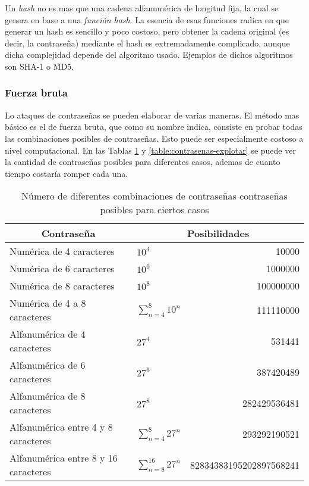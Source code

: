 Un \emph{hash} no es mas que una cadena alfanumérica de longitud fija, la cual se genera en base a una \emph{función hash}. La esencia de esas funciones radica en que generar un hash es sencillo y poco costoso, pero obtener la cadena original (es decir, la contraseña) mediante el hash es extremadamente complicado, aunque dicha complejidad depende del algoritmo usado. Ejemplos de dichos algoritmos son SHA-1 o MD5.

\subsubsection{Fuerza bruta}

Lo ataques de contraseñas se pueden elaborar de varias maneras. El método mas básico es el de fuerza bruta, que como su nombre indica, consiste en probar todas las combinaciones posibles de contraseñas. Esto puede ser especialmente costoso a nivel computacional. En las Tablas \ref{table:contrasenas} y \ref{table:contrasenas-explotar} se puede ver la cantidad de contraseñas posibles para diferentes casos, ademas de cuanto tiempo costaría romper cada una.

\begin{table}[H]
	\centering
	\begin{tabular}{ |l|l|r| } 
		\hline
		\multicolumn{1}{|c|}{Contraseña} & 
		\multicolumn{2}{|c|}{Posibilidades} \\
		\hline
		Numérica de 4 caracteres 				& $ 10^4 $						& 10000 					\\
		Numérica de 6 caracteres 				& $ 10^6 $ 						& 1000000				 	\\
		Numérica de 8 caracteres 				& $ 10^8 $ 						& 100000000 			 	\\
		Numérica de 4 a 8 caracteres 			& $ \sum_{n=4}^{8} 10^{n} $ 	& 111110000 				\\
		\hline
		Alfanumérica de 4 caracteres 			& $ 27^4  $ 					& 531441  				 	\\
		Alfanumérica de 6 caracteres 			& $ 27^6 $ 						& 387420489  				\\
		Alfanumérica de 8 caracteres			& $ 27^8 $ 						& 282429536481 			 	\\
		Alfanumérica entre 4 y 8 caracteres		& $ \sum_{n=4}^{8} 27^{n} $		& 293292190521 				\\
		Alfanumérica entre 8 y 16 caracteres 	& $ \sum_{n=8}^{16} 27^{n} $	& 82834383195202897568241	\\
		\hline
	\end{tabular}
	\caption{Número de diferentes combinaciones de contraseñas contraseñas posibles para ciertos casos}
	\label{table:contrasenas}
\end{table}

